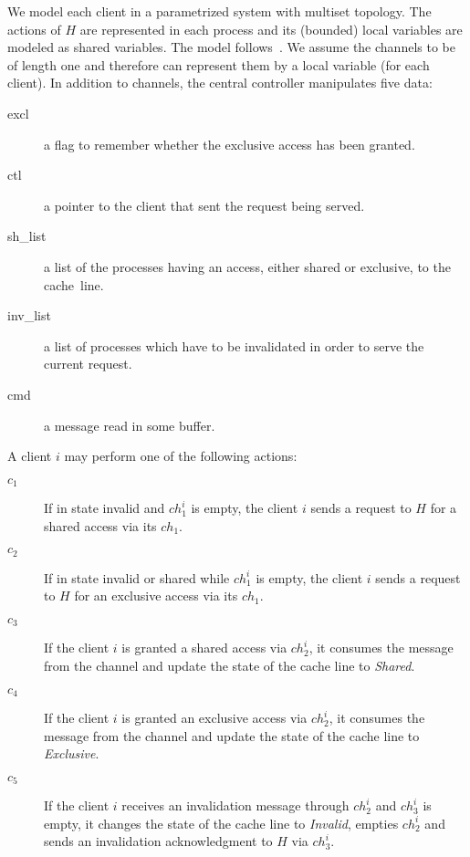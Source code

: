 We model each client in a parametrized system with multiset topology.
The actions of $H$ are represented in each process and its (bounded)
local variables are modeled as shared variables. The model
follows~\cite{PRZ-tacas01}. We assume the channels to be of length one
and therefore can represent them by a local variable (for each
client).  In addition to channels, the central controller manipulates
five data:
\begin{description}
\item[\color{blue} excl] a flag to remember whether the exclusive access has been granted.%
\item[\color{blue} ctl] a pointer to the client that sent the request being served.%
\item[\color{blue} sh\_list] a list of the processes having an access, either shared or exclusive, to the cache~line. %
\item[\color{blue} inv\_list] a list of  processes which have to be invalidated in order to serve the current request.%
\item[\color{blue} cmd] a message read in some buffer.%
\end{description}%

A client $i$ may perform one of the following actions:
\begin{description}
\item[\color{orange} $c_1$] If in state invalid and $ch_1^i$ is empty, the client $i$ sends a request to $H$
  for a shared access via its $ch_1$.
\item[\color{orange} $c_2$] If in state invalid or shared while $ch_1^i$ is empty, the client $i$ sends 
  a request to $H$ for an exclusive access via its $ch_1$.
\item[\color{orange} $c_3$] If the client $i$ is granted a shared access via $ch_2^i$,
  it consumes the message from the channel and update the state of the
  cache line to \emph{Shared}. 
\item[\color{orange} $c_4$] If the client $i$ is granted an exclusive access via $ch_2^i$,
  it consumes the message from the channel and update the state of the
  cache line to \emph{Exclusive}.
\item[\color{orange} $c_5$] If the client $i$ receives an invalidation message through
  $ch_2^i$ and $ch_3^i$ is empty, it changes the state of the cache
  line to \emph{Invalid}, empties $ch_2^i$ and sends an invalidation
  acknowledgment to $H$ via $ch_3^i$.
\end{description}

